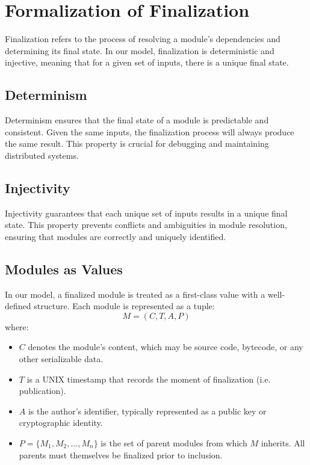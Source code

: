 \documentclass[sigplan,screen]{acmart}
\begin{document}
\section{Formalization of Finalization}
\label{formalization-finalization}

Finalization refers to the process of resolving a module's dependencies and determining its final state. In our model, finalization is deterministic and injective, meaning that for a given set of inputs, there is a unique final state.

\subsection{Determinism}
Determinism ensures that the final state of a module is predictable and consistent. Given the same inputs, the finalization process will always produce the same result. This property is crucial for debugging and maintaining distributed systems.

\subsection{Injectivity}
Injectivity guarantees that each unique set of inputs results in a unique final state. This property prevents conflicts and ambiguities in module resolution, ensuring that modules are correctly and uniquely identified.

\subsection{Modules as Values}
\label{sec:modules-as-values}

In our model, a finalized module is treated as a first-class value with a well-defined structure. Each module is represented as a tuple:
\[
M = (C, T, A, P)
\]
where:

\begin{itemize}
    \item $C$ denotes the module's content, which may be source code, bytecode, or any other serializable data.
    \item $T$ is a UNIX timestamp that records the moment of finalization (i.e. publication).
    \item $A$ is the author's identifier, typically represented as a public key or cryptographic identity.
    \item $P = \{M_1, M_2, \ldots, M_n\}$ is the set of parent modules from which $M$ inherits. All parents must themselves be finalized prior to inclusion.
\end{itemize}
\end{document}
